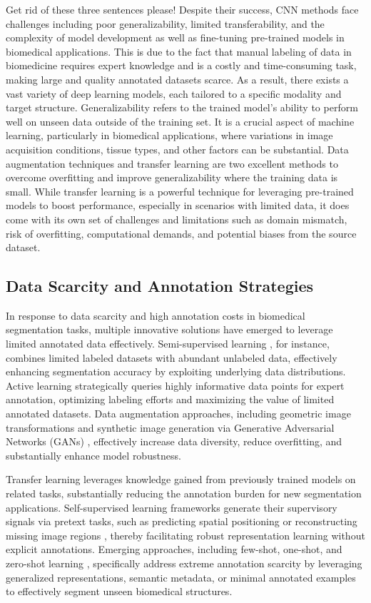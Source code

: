 \documentclass[./dissertation.tex]{subfiles}
\begin{document}
\textcolor{Hedges}{Get rid of these three sentences please!} Despite their success, CNN methods face challenges including poor generalizability, limited transferability, and the complexity of model development as well as fine-tuning pre-trained models in biomedical applications. This is due to the fact that manual labeling of data in biomedicine requires expert knowledge and is a costly and time-consuming task, making large and quality annotated datasets scarce. As a result, there exists a vast variety of deep learning models, each tailored to a specific modality and target structure. Generalizability refers to the trained model’s ability to perform well on unseen data outside of the training set. It is a crucial aspect of machine learning, particularly in biomedical applications, where variations in image acquisition conditions, tissue types, and other factors can be substantial. Data augmentation techniques and transfer learning are two excellent methods to overcome overfitting and improve generalizability where the training data is small. While transfer learning is a powerful technique for leveraging pre-trained models to boost performance, especially in scenarios with limited data, it does come with its own set of challenges and limitations such as domain mismatch, risk of overfitting, computational demands, and potential biases from the source dataset.

\textcolor{BulldogRed}{\subsection{Data Scarcity and Annotation Strategies}}
\textcolor{BulldogRed}{In response to data scarcity and high annotation costs in biomedical segmentation tasks, multiple innovative solutions have emerged to leverage limited annotated data effectively. Semi-supervised learning \cite{van2020survey}, for instance, combines limited labeled datasets with abundant unlabeled data, effectively enhancing segmentation accuracy by exploiting underlying data distributions. Active learning \cite{settles2009active} strategically queries highly informative data points for expert annotation, optimizing labeling efforts and maximizing the value of limited annotated datasets. Data augmentation approaches, including geometric image transformations and synthetic image generation via Generative Adversarial Networks (GANs) \cite{goodfellow2014generative}, effectively increase data diversity, reduce overfitting, and substantially enhance model robustness.}

\textcolor{BulldogRed}{Transfer learning leverages knowledge gained from previously trained models on related tasks, substantially reducing the annotation burden for new segmentation applications. Self-supervised learning frameworks generate their supervisory signals via pretext tasks, such as predicting spatial positioning or reconstructing missing image regions \cite{chen2020simple}, thereby facilitating robust representation learning without explicit annotations. Emerging approaches, including few-shot, one-shot, and zero-shot learning \cite{zhao2023one}, specifically address extreme annotation scarcity by leveraging generalized representations, semantic metadata, or minimal annotated examples to effectively segment unseen biomedical structures.}
\end{document}
